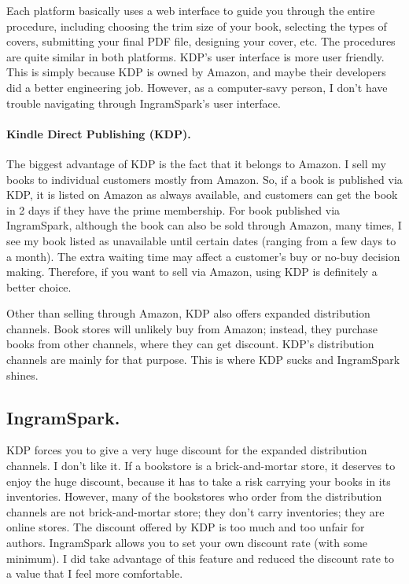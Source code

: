 Each platform basically uses a web interface to guide you through the entire procedure,
including choosing the trim size of your book, selecting the types of covers, submitting your
final PDF file, designing your cover, etc. The procedures are quite similar in both platforms. 
KDP's user interface is more user friendly. This is simply because KDP is owned by Amazon, and
maybe their developers did a better engineering job. However, as a computer-savy person, I 
don't have trouble navigating through IngramSpark's user interface.


\paragraph{Kindle Direct Publishing (KDP).}
The biggest advantage of KDP is the fact that it belongs to Amazon. I sell my books to
individual customers mostly from Amazon. So, if a book is published via KDP, it is listed on
Amazon as always available, and customers can get the book in 2 days if they have the prime
membership.  For book published via IngramSpark, although the book can also be
sold through Amazon, many times, I see my book listed as unavailable until certain dates
(ranging from a few days to a month). The extra waiting time may affect a customer's buy or
no-buy decision making.  
Therefore, if you want to sell via Amazon, using KDP is definitely a better choice. 


Other than selling through Amazon, KDP also offers expanded distribution channels. Book stores
will unlikely buy from Amazon; instead, they purchase books from other channels, where they can
get discount. KDP's distribution channels are mainly for that purpose. 
This is where KDP sucks and IngramSpark shines. 


\subsection{IngramSpark.} 
KDP forces you to give a very huge discount for the expanded distribution channels. I don't
like it. If a bookstore is a brick-and-mortar store, it deserves to enjoy the huge discount,
because it has to take a risk carrying your books in its inventories. However, many of the
bookstores who order from the distribution channels are not brick-and-mortar store; they
don't carry inventories; they are online stores. The discount offered by KDP is too much and
too unfair for authors. 
IngramSpark allows you to set your own discount rate (with some minimum). I did take advantage
of this feature and reduced the discount rate to a value that I feel more comfortable. 


